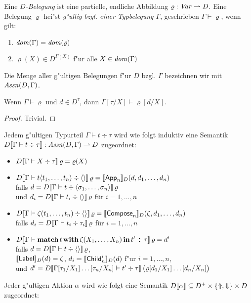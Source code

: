 \documentclass[%
  12pt,%
  a4paper,%
]{article}
\newcommand{\match}[3]{\textbf{match}\,{#1}\,\textbf{with}\,{#2}\,\textbf{in}\,{#3}}
\newcommand{\Tj}[3]{{#1}\vdash{#2}\div{#3}}
\begin{document}
Eine \emph{$D$-Belegung} ist eine partielle, endliche Abbildung $\varrho: \mathit{Var} \rightharpoonup D$. Eine Belegung
$\varrho$ hei"st \emph{g"ultig bzgl. einer Typbelegung $\Gamma$}, geschrieben $\Gamma \vdash \varrho$,
wenn gilt:
\begin{enumerate}
\item $\mathit{dom}(\Gamma) = \mathit{dom}(\varrho)$
\item $\varrho(X) \in D^{\Gamma(X)}$ f"ur alle $X \in \mathit{dom}(\Gamma)$
\end{enumerate}
Die Menge aller g"ultigen Belegungen f"ur $D$ bzgl. $\Gamma$ bezeichnen wir mit $\mathit{Assn}(D,\Gamma)$.
\begin{lemma}
  Wenn $\Gamma \vdash \varrho$ und $d \in D^\tau$, dann $\Gamma[\tau/X] \vdash \varrho[d/X]$.
\end{lemma}
\begin{proof}
  Trivial.
\end{proof}
Jedem g"ultigen Typurteil $\Tj{\Gamma}{t}{\tau}$ wird wie folgt induktiv
eine Semantik $D\sem{\Tj{\Gamma}{t}{\tau}}: \Assn(D,\Gamma) \pto D$ zugeordnet:
\begin{itemize}
\item $D\sem{\Tj{\Gamma}{X}{\tau}}\,\varrho = \varrho(X)$
\item $D\sem{\Tj{\Gamma}{t \langle t_1,\ldots,t_n \rangle}{\langle \rangle}}\,\varrho
  = \sem{\App_n}_D(d, d_1, \ldots, d_n)$ \\
  falls $d = D\sem{\Tj{\Gamma}{t}{\langle\sigma_1,\ldots,\sigma_n\rangle}}\,\varrho$ \\
  und $d_i = D\sem{\Tj{\Gamma}{t_i}{\langle \rangle}}\,\varrho$ f\"ur $i=1,\ldots,n$
\item $D\sem{\Tj{\Gamma}{\zeta(t_1,\ldots,t_n)}{\langle \rangle}}\,\varrho
  = \sem{\Compose_n}_D(\zeta,d_1,\ldots,d_n)$ \\
  falls $d_i = D\sem{\Tj{\Gamma}{t_i}{\tau_i}}\,\varrho$ f\"ur $i=1,\ldots,n$
\item $D\sem{\Tj{\Gamma}{\match{t}{\zeta(X_1,\ldots,X_n)}{t'}}{\tau}}\,\varrho
  = d'$ \\
  falls $d = D\sem{\Tj{\Gamma}{t}{\langle \rangle}}\,\varrho$, \\
  $[\![\mathsf{Label}]\!]_D(d) = \zeta$, $d_i = [\![\mathsf{Child}_n^i]\!]_D(d)$ f"ur $i=1,\ldots,n$, \\
  und $d' = D\sem{\Tj{\Gamma[\tau_1/X_1]\ldots[\tau_n/X_n]}{t'}{\tau}}\,\bigl(\varrho[d_1/X_1]\ldots[d_n/X_n]\bigr)$
\end{itemize}
Jeder g"ultigen Aktion $\alpha$ wird wie folgt eine Semantik
$D[\![\alpha]\!] \subseteq D^+ \times \{\Uparrow,\Downarrow\} \times D$ zugeordnet:
\end{document}
